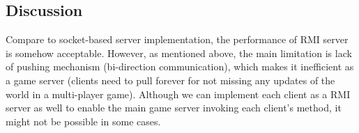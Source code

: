 \documentclass[11pt, oneside]{article}   	%
\begin{document}
\subsection{Discussion}
Compare to socket-based server implementation, the performance of RMI server is somehow acceptable. However, as mentioned above, the main limitation is lack of pushing mechanism (bi-direction communication), which makes it inefficient as a game server (clients need to pull forever for not missing any updates of the world in a multi-player game). Although we can implement each client as a RMI server as well to enable the main game server invoking each client's method, it might not be possible in some cases.
\end{document}
